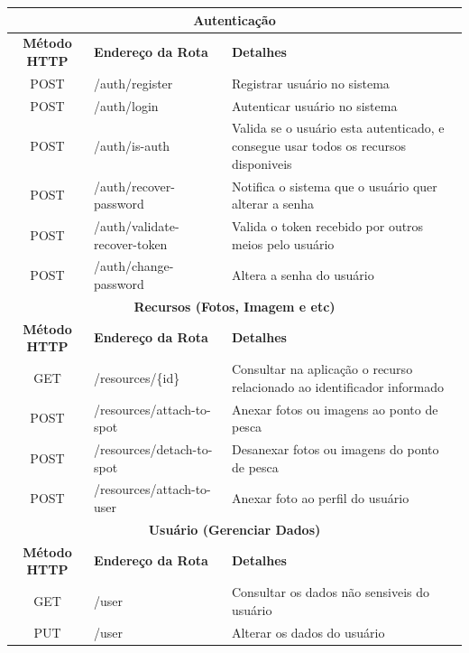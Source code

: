 \begin{quadro}[h!]
    \centering
    \caption[Rotas Disponiveis]{Rotas Disponiveis
    \label{qua:quadro-api-rotas}}
    \setlength{\extrarowheight}{4pt}
    \begin{tabular}{|c|l|p{}|} 
        \hline
        \multicolumn{3}{|c|}{\textbf{Autenticação}} \\
        \hline
        \textbf{Método HTTP} & \textbf{Endereço da Rota} & \textbf{Detalhes} \\
        \hline
        POST & /auth/register & Registrar usuário no sistema \\
        \hline
        POST & /auth/login & Autenticar usuário no sistema \\
        \hline
        POST & /auth/is-auth & Valida se o usuário esta autenticado, e consegue usar todos os recursos disponiveis \\
        \hline
        POST & /auth/recover-password & Notifica o sistema que o usuário quer alterar a senha \\
        \hline
        POST & /auth/validate-recover-token & Valida o token recebido por outros meios pelo usuário \\
        \hline
        POST & /auth/change-password & Altera a senha do usuário \\
        \hline


        \multicolumn{3}{|c|}{\textbf{Recursos (Fotos, Imagem e etc)}} \\
        \hline
        \textbf{Método HTTP} & \textbf{Endereço da Rota} & \textbf{Detalhes} \\
        \hline
        GET & /resources/\{id\} & Consultar na aplicação o recurso relacionado ao identificador informado \\
        \hline
        POST & /resources/attach-to-spot & Anexar fotos ou imagens ao ponto de pesca \\
        \hline
        POST & /resources/detach-to-spot & Desanexar fotos ou imagens do ponto de pesca \\
        \hline
        POST & /resources/attach-to-user & Anexar foto ao perfil do usuário \\
        \hline


        \multicolumn{3}{|c|}{\textbf{Usuário (Gerenciar Dados)}} \\
        \hline
        \textbf{Método HTTP} & \textbf{Endereço da Rota} & \textbf{Detalhes} \\
        \hline
        GET & /user & Consultar os dados não sensiveis do usuário \\
        \hline
        PUT & /user & Alterar os dados do usuário \\
        \hline

    \end{tabular}
\end{quadro}

